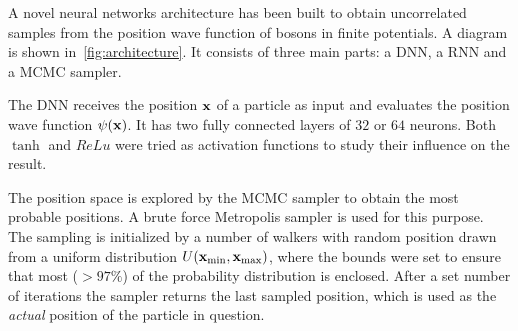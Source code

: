 \begin{figure*}[t!]
\caption{\label{fig:architecture}
  Diagrammatic overview of the neural network architecture. The shaded
  blue region is a single ``cell'' consisting of a RNN to update the hidden
  state, a DNN to evaluate the position wave function, and a brute force
  Metropolis sampler to sample the position space. The Metropolis sampling yields a
  probable position for the particle, \(\tilde{x}_{\text{final}}^{i}\), which is
  taken as the ``actual'' position of the particle and used in the RNN to update the hidden state. Each particle in the system
  corresponds to one cell, with the subsequent particles depending on the former
  through the hidden state. Once all of the particles have been iterated through, the
  combined wave function \(\Psi\) can be obtained from their single
  particle wave functions. Each MCMC sampling is initialized by random positions
\(\tilde{x}_{0}^{i}\)}
\end{figure*}

A novel neural networks architecture has been built to obtain uncorrelated
samples from the position wave function of bosons in finite potentials. A
diagram is shown in~\cref{fig:architecture}.
It consists of three main parts: a DNN, a RNN and a MCMC sampler.


The DNN receives the position \(\vb{x}\) of a particle as input and evaluates the
position wave function \(\psi(\vb{x})\). It has two fully connected layers of
\(32\) or \(64\) neurons. Both \(\tanh\) and \(ReLu\) were tried as activation
functions to study their influence on the result. 


The position space is explored by the MCMC sampler to
obtain the most probable positions. A brute force Metropolis sampler is used for
this purpose. The sampling is initialized by a number of walkers with random
position drawn from a uniform distribution \(U(\vb{x}_{\text{min}}, \vb{x}_{\text{max}})\), where the bounds were
set to ensure that most (\(>97\%\)) of the probability distribution is enclosed. After a set number of iterations the sampler returns the last sampled
position, which is used as the \textit{actual} position of the particle in
question.


